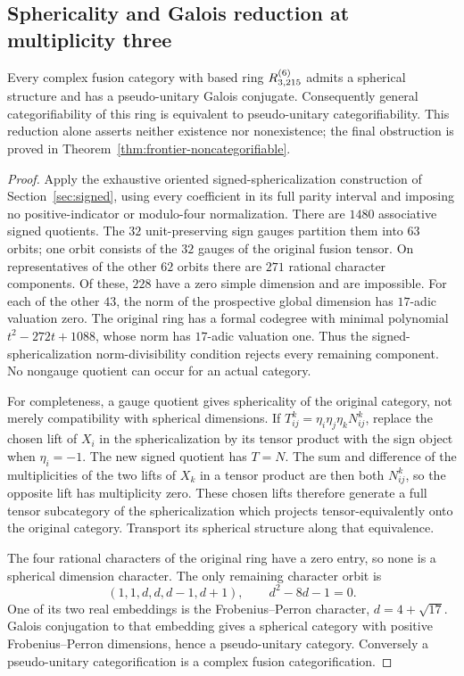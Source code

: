\subsection{Sphericality and Galois reduction at multiplicity three}
\label{sec:frontier-spherical-reduction}
\begin{proposition}\label{prop:frontier-galois-pu}
Every complex fusion category with based ring $R^{(6)}_{3,215}$ admits a
spherical structure and has a pseudo-unitary Galois conjugate.
Consequently general categorifiability of this ring is equivalent to
pseudo-unitary categorifiability. This reduction alone asserts neither
existence nor nonexistence; the final obstruction is proved in
Theorem~\ref{thm:frontier-noncategorifiable}.
\end{proposition}
\begin{proof}
Apply the exhaustive oriented signed-sphericalization construction of
Section~\ref{sec:signed}, using every coefficient in its full parity
interval and imposing no positive-indicator or modulo-four normalization.
There are $1480$ associative signed quotients. The $32$ unit-preserving
sign gauges partition them into $63$ orbits; one orbit consists of the
$32$ gauges of the original fusion tensor. On representatives of the
other $62$ orbits there are $271$ rational character components.
Of these, $228$ have a zero simple dimension and are impossible.
For each of the other $43$, the norm of the prospective global
dimension has $17$-adic valuation zero. The original ring has a formal
codegree with minimal polynomial $t^2-272t+1088$, whose norm has
$17$-adic valuation one. Thus the signed-sphericalization
norm-divisibility condition rejects every remaining component. No
nongauge quotient can occur for an actual category.

For completeness, a gauge quotient gives sphericality of the original
category, not merely compatibility with spherical dimensions. If
$T_{ij}^k=\eta_i\eta_j\eta_kN_{ij}^k$, replace the chosen lift of $X_i$
in the sphericalization by its tensor product with the sign object
when $\eta_i=-1$. The new signed quotient has $T=N$. The sum and
difference of the multiplicities of the two lifts of $X_k$ in a tensor
product are then both $N_{ij}^k$, so the opposite lift has multiplicity
zero. These chosen lifts therefore generate a full tensor subcategory
of the sphericalization which projects tensor-equivalently onto the
original category. Transport its spherical structure along that
equivalence.

The four rational characters of the original ring have a zero entry,
so none is a spherical dimension character. The only remaining
character orbit is
\[
 (1,1,d,d,d-1,d+1),\qquad d^2-8d-1=0.
\]
One of its two real embeddings is the Frobenius--Perron character,
$d=4+\sqrt{17}$. Galois conjugation to that embedding gives a spherical
category with positive Frobenius--Perron dimensions, hence a
pseudo-unitary category. Conversely a pseudo-unitary categorification
is a complex fusion categorification.


\end{proof}
